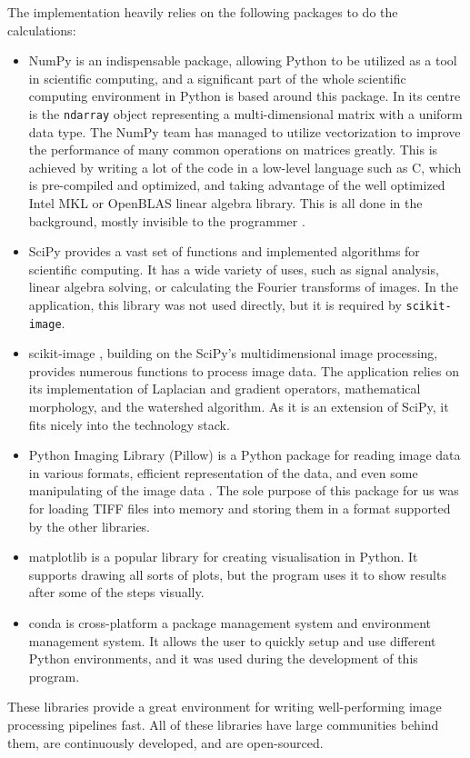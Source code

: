 \documentclass[
  digital,     %
  oneside,     %
  nosansbold,  %
  nocolorbold, %
  lof,         %
  lot,         %
]{fithesis4}
\begin{document}
The implementation heavily relies on the following packages to do the calculations:
\begin{itemize}
    \item{NumPy \cite{harris2020array} is an indispensable package, allowing
        Python to be utilized as a tool in scientific computing, and a
        significant part of the whole scientific computing environment in Python
        is based around this package. In its centre is the \texttt{ndarray} object
        representing a multi-dimensional matrix with a uniform data type. The
        NumPy team has managed to utilize vectorization to improve the
        performance of many common operations on matrices greatly. This is achieved by
        writing a lot of the code in a low-level language such as C, which is
        pre-compiled and optimized, and taking advantage of the well optimized
        Intel MKL or OpenBLAS linear algebra library. This is all done in the
        background, mostly invisible to the programmer \cite{numpyManual2022}.}
    \item{SciPy \cite{2020SciPy-NMeth} provides a vast set of functions and
        implemented algorithms for scientific computing. It has a wide variety of
        uses, such as signal analysis, linear algebra solving, or calculating the
        Fourier transforms of images. In the application, this library was not used
        directly, but it is required by \texttt{scikit-image}.}
    \item{scikit-image \cite{scikit-image}, building on the SciPy's
        multidimensional image processing, provides numerous functions to
        process image data. The application relies on its implementation of
        Laplacian and gradient operators, mathematical morphology, and the watershed
        algorithm. As it is an extension of SciPy, it fits nicely into the
        technology stack.}
    \item{Python Imaging Library (Pillow) is a Python package for reading image
        data in various formats, efficient representation of the data, and even
        some manipulating of the image data \cite{clarkc20102023}. The sole
        purpose of this package for us was for loading TIFF files into memory
        and storing them in a format supported by the other libraries.}
    \item{matplotlib \cite{hunter2007} is a popular library for creating
        visualisation in Python. It supports drawing all sorts of plots, but the
        program uses it to show results after some of the steps visually.}
    \item{conda is cross-platform a package management system and environment
        management system. It allows the user to quickly setup and use different
        Python environments, and it was used during the development of this program.
        \cite{conda-manual}}
\end{itemize}
These libraries provide a great environment for writing well-performing image
processing pipelines fast. All of these libraries have large communities
behind them, are continuously developed, and are open-sourced.
\end{document}
